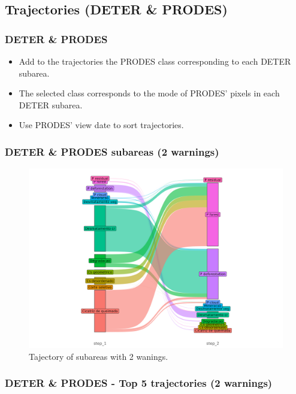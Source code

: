 \documentclass[aspectratio=169]{beamer}
\begin{document}
\subsection{Trajectories (DETER \& PRODES)} 

\begin{frame}
    \frametitle{DETER \& PRODES}
    \begin{itemize}
        \item Add to the trajectories the PRODES class corresponding to each
            DETER subarea.
        \item The selected class corresponds to the mode of PRODES' pixels in
            each DETER subarea.
        \item Use PRODES' view date to sort trajectories.
    \end{itemize}
\end{frame}

\begin{frame}
    \frametitle{DETER \& PRODES subareas (2 warnings)}
    \begin{figure}[h] 
        \includegraphics[width=0.65\linewidth]
        {./figures/plot_deter_prodes_subarea_trajectory_2.png}
        \caption{Tajectory of subareas with 2 wanings.}
        \label{fig:deter_prodes_subarea_trajectory_2}
    \end{figure}
\end{frame}

\begin{frame}[allowframebreaks]
    \frametitle{DETER \& PRODES - Top 5 trajectories (2 warnings)}
    
\end{frame}
\end{document}
